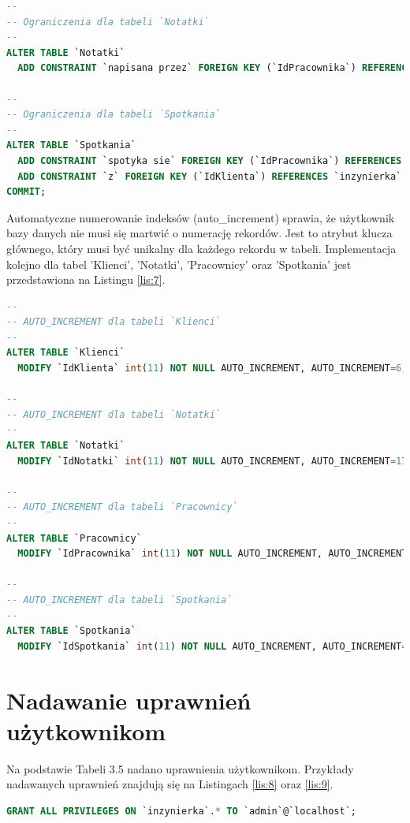 \documentclass[eng,printmode,openany,oneside]{mgr}
\begin{document}
	
\begin{lstlisting}[caption={Ograniczenia tabel}, language=SQL, label={lis:6}]
--
-- Ograniczenia dla tabeli `Notatki`
--
ALTER TABLE `Notatki`
  ADD CONSTRAINT `napisana przez` FOREIGN KEY (`IdPracownika`) REFERENCES `inzynierka`.`Pracownicy` (`IdPracownika`) ON DELETE CASCADE ON UPDATE CASCADE;

--
-- Ograniczenia dla tabeli `Spotkania`
--
ALTER TABLE `Spotkania`
  ADD CONSTRAINT `spotyka sie` FOREIGN KEY (`IdPracownika`) REFERENCES `inzynierka`.`Pracownicy` (`IdPracownika`) ON DELETE CASCADE ON UPDATE CASCADE,
  ADD CONSTRAINT `z` FOREIGN KEY (`IdKlienta`) REFERENCES `inzynierka`.`Klienci` (`IdKlienta`) ON DELETE CASCADE ON UPDATE CASCADE;
COMMIT;
\end{lstlisting}
	
	
Automatyczne numerowanie indeksów (auto\_increment) sprawia, że użytkownik bazy danych nie musi się martwić o numerację rekordów. Jest to atrybut klucza głównego, który musi być unikalny dla każdego rekordu w tabeli. Implementacja kolejno dla tabel 'Klienci', 'Notatki', 'Pracownicy' oraz 'Spotkania' jest przedstawiona na Listingu \ref{lis:7}.
	
	
\begin{lstlisting}[caption={Automatyczne numerowanie indeksów}, language=SQL, label={lis:7}]
--
-- AUTO_INCREMENT dla tabeli `Klienci`
--
ALTER TABLE `Klienci`
  MODIFY `IdKlienta` int(11) NOT NULL AUTO_INCREMENT, AUTO_INCREMENT=6;

--
-- AUTO_INCREMENT dla tabeli `Notatki`
--
ALTER TABLE `Notatki`
  MODIFY `IdNotatki` int(11) NOT NULL AUTO_INCREMENT, AUTO_INCREMENT=17;

--
-- AUTO_INCREMENT dla tabeli `Pracownicy`
--
ALTER TABLE `Pracownicy`
  MODIFY `IdPracownika` int(11) NOT NULL AUTO_INCREMENT, AUTO_INCREMENT=5;

--
-- AUTO_INCREMENT dla tabeli `Spotkania`
--
ALTER TABLE `Spotkania`
  MODIFY `IdSpotkania` int(11) NOT NULL AUTO_INCREMENT, AUTO_INCREMENT=23;
\end{lstlisting}
	

\section{Nadawanie uprawnień użytkownikom}

Na podstawie Tabeli 3.5 nadano uprawnienia użytkownikom. Przykłady nadawanych uprawnień znajdują się na Listingach \ref{lis:8} oraz \ref{lis:9}.


\begin{lstlisting}[caption={Nadanie uprawnień w całej bazie danych dla administratora}, language=SQL, label={lis:8}]
GRANT ALL PRIVILEGES ON `inzynierka`.* TO `admin`@`localhost`;
\end{lstlisting}
\end{document}
